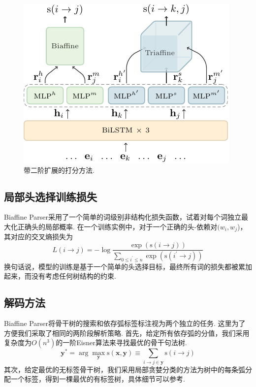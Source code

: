 \begin{figure}[tb]
  \centering
  \includegraphics[scale=1.5]{figures/dep-framework.pdf}
  \caption{带二阶扩展的打分方法.}
  \label{fig:dep-framework}
\end{figure}

\subsection{局部头选择训练损失}
Biaffine Parser采用了一个简单的词级别非结构化损失函数，试着对每个词独立最大化正确头的局部概率.
在一个训练实例中，对于一个正确的头-依赖对$(w_i, w_j$)，其对应的交叉熵损失为
\begin{equation} \label{eq:biaffine-loss}
  \mathit{L}(i\rightarrow j) = -\log{\frac{\exp(\mathrm{s}(i\rightarrow j))}{\sum_{0 \le i^{\prime} \le n} \exp(\mathrm{s}(i^{\prime}\rightarrow j))}}
\end{equation}
换句话说，模型的训练是基于一个简单的头选择目标，最终所有词的损失都被累加起来，而没有考虑任何树结构的约束.

\subsection{解码方法}
Biaffine Parser将骨干树的搜索和依存弧标签标注视为两个独立的任务.
这里为了方便我们采取了相同的两阶段解析策略.
首先，给定所有依存弧的分值，我们采用复杂度为$O(n^3)$的一阶Eisner算法来寻找最优的骨干句法树.
\begin{equation}
  \label{eq:map-decoding}
  {\boldsymbol{y}}^* = \arg\max_{\boldsymbol{y}} \mathrm{s}(\boldsymbol{x},\boldsymbol{y}) \equiv
  \sum_{i \rightarrow j \in \boldsymbol{y}}{\mathrm{s}(i\rightarrow j)}
\end{equation}
其次，给定最优的无标签骨干树，我们采用局部贪婪分类的方法为树中的每条弧分配一个标签，得到一棵最优的有标签树，具体细节可以参考\citet{dozat-etal-2017-biaffine}.

